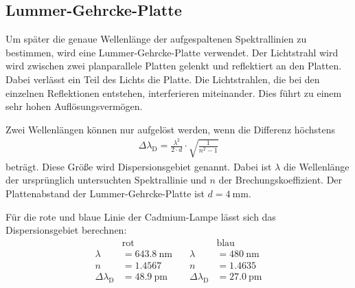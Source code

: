 \subsection{Lummer-Gehrcke-Platte}
Um später die genaue Wellenlänge der aufgespaltenen Spektrallinien zu bestimmen, wird eine Lummer-Gehrcke-Platte verwendet.
Der Lichtstrahl wird wird zwischen zwei planparallele Platten gelenkt und reflektiert an den Platten.
Dabei verlässt ein Teil des Lichts die Platte.
Die Lichtstrahlen, die bei den einzelnen Reflektionen entstehen, interferieren miteinander.
Dies führt zu einem sehr hohen Auflösungsvermögen.

Zwei Wellenlängen können nur aufgelöst werden, wenn die Differenz höchstens
\begin{align}
	\Delta \lambda_\text{D} = \frac{\lambda^2}{2 \cdot d} \cdot \sqrt{\frac{1}{n^2 - 1}}
\end{align}
beträgt.
Diese Größe wird Dispersionsgebiet genannt.
Dabei ist $\lambda$ die Wellenlänge der ursprünglich untersuchten Spektrallinie und $n$ der Brechungskoeffizient.
Der Plattenabstand der Lummer-Gehrcke-Platte ist $d = \SI{4}{\milli \meter}$.

Für die rote und blaue Linie der Cadmium-Lampe lässt sich das Dispersionsgebiet berechnen:
\begin{align}
	&\text{rot} & \quad &\text{blau} \\
	\lambda &= \SI{643.8}{\nano \meter} & \quad \lambda &= \SI{480}{\nano \meter} \\
	n &=  \SI{1.4567}{} & \quad n &= \SI{1.4635}{} \\
	\Delta \lambda_\text{D} &= \SI{48.9}{\pico \meter} & \quad \Delta \lambda_\text{D} &= \SI{27.0}{\pico \meter}
\end{align}